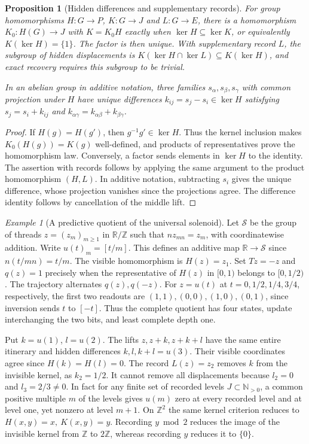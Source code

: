 \documentclass[aps,pra,onecolumn,superscriptaddress,nofootinbib,10pt]{revtex4-2}
\newtheorem{proposition}[theorem]{Proposition}
\theoremstyle{definition}
\theoremstyle{remark}
\newtheorem{example}[theorem]{Example}
\begin{document}
\begin{proposition}[Hidden differences and supplementary records]\label{ob:ledger}
For group homomorphisms \(H\colon G\to P\), \(K\colon G\to J\) and
\(L\colon G\to E\), there is a homomorphism \(K_0\colon H(G)\to J\)
with \(K=K_0H\) exactly when \(\ker H\subseteq\ker K\), or equivalently
\(K(\ker H)=\{1\}\). The factor is then unique. With supplementary
record \(L\), the subgroup of hidden displacements is
\(K(\ker H\cap\ker L)\subseteq K(\ker H)\), and exact recovery
requires this subgroup to be trivial.

In an abelian group in additive notation, three families
\(s_\alpha,s_\beta,s_\gamma\) with common projection under \(H\)
have unique differences \(k_{ij}=s_j-s_i\in\ker H\) satisfying
\(s_j=s_i+k_{ij}\) and \(k_{\alpha\gamma}=k_{\alpha\beta}+k_{\beta\gamma}\).
\end{proposition}
\begin{proof}
If \(H(g)=H(g')\), then \(g^{-1}g'\in\ker H\). Thus the kernel inclusion
makes \(K_0(H(g))=K(g)\) well-defined, and products of representatives
prove the homomorphism law. Conversely, a factor sends elements in
\(\ker H\) to the identity. The assertion with records follows by
applying the same argument to the product homomorphism \((H,L)\).
In additive notation, subtracting \(s_i\) gives the unique difference,
whose projection vanishes since the projections agree. The difference
identity follows by cancellation of the middle lift.
\end{proof}

\begin{example}[A predictive quotient of the universal solenoid]\label{ob:solenoid}
Let \(\mathcal S\) be the group of threads
\(z=(z_m)_{m\ge1}\) in \(\mathbb R/\mathbb Z\) such that \(nz_{mn}=z_m\),
with coordinatewise addition. Write \(u(t)_m=[t/m]\). This defines
an additive map \(\mathbb R\to\mathcal S\) since \(n(t/mn)=t/m\).
The visible homomorphism is \(H(z)=z_1\). Set \(Tz=-z\) and
\(q(z)=1\) precisely when the representative of \(H(z)\) in \([0,1)\)
belongs to \([0,1/2)\). The trajectory alternates \(q(z),q(-z)\).
For \(z=u(t)\) at \(t=0,1/2,1/4,3/4\), respectively, the first
two readouts are \((1,1),(0,0),(1,0),(0,1)\), since inversion
sends \(t\) to \([-t]\). Thus the complete quotient has four states,
update interchanging the two bits, and least complete depth one.

Put \(k=u(1)\), \(l=u(2)\). The lifts \(z,z+k,z+k+l\)
have the same entire itinerary and hidden differences \(k,l,k+l=u(3)\).
Their visible coordinates agree since \(H(k)=H(l)=0\).
The record \(L(z)=z_2\) removes \(k\) from the invisible kernel,
as \(k_2=1/2\). It cannot remove all displacements because \(l_2=0\)
and \(l_3=2/3\ne0\). In fact for any finite set of recorded levels
\(J\subset\mathbb N_{>0}\), a common positive multiple \(m\) of the
levels gives \(u(m)\) zero at every recorded level and at level
one, yet nonzero at level \(m+1\). On \(\mathbb Z^2\) the same kernel
criterion reduces to \(H(x,y)=x,\ K(x,y)=y\). Recording \(y\bmod2\)
reduces the image of the invisible kernel from \(\mathbb Z\) to
\(2\mathbb Z\), whereas recording \(y\) reduces it to \(\{0\}\).
\end{example}
\end{document}
